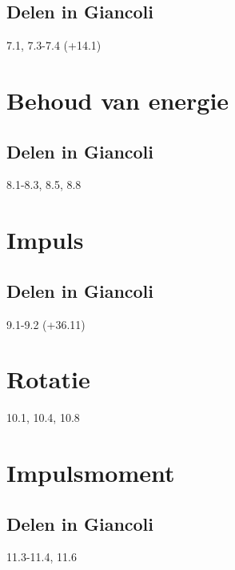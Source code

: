 \documentclass[12pt,a4paper]{article}
\begin{document}
    \subsection{Delen in Giancoli}
    7.1, 7.3-7.4 (+14.1)


    \section{Behoud van energie}

    \subsection{Delen in Giancoli}
    8.1-8.3, 8.5, 8.8


    \section{Impuls}

    \subsection{Delen in Giancoli}
    9.1-9.2 (+36.11)


    \section{Rotatie}
    10.1, 10.4, 10.8


    \section{Impulsmoment}

    \subsection{Delen in Giancoli}
    11.3-11.4, 11.6
    
    
\end{document}
